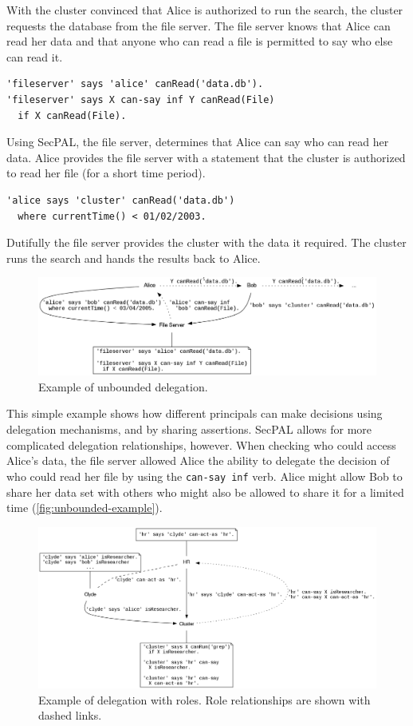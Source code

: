 \documentclass[thesis.tex]{subfiles}
\begin{document}
With the cluster convinced that Alice is authorized to run the search,
the cluster requests the database from the file server.  The file
server knows that Alice can read her data and that anyone who can read
a file is permitted to say who else can read it.
\begin{lstlisting}
'fileserver' says 'alice' canRead('data.db').
'fileserver' says X can-say inf Y canRead(File)
  if X canRead(File).
\end{lstlisting}
Using SecPAL, the file server, determines that Alice can say who can
read her data.  Alice provides the file server with a statement that
the cluster is authorized to read her file (for a short time
period).
\begin{lstlisting}
'alice says 'cluster' canRead('data.db')
  where currentTime() < 01/02/2003.
\end{lstlisting}
Dutifully the file server provides the cluster with the data
it required.  The cluster runs the search and hands the results back to Alice.

\begin{figure}
  \centering
  \includegraphics[width=\textwidth]{figures/secpal-example-delegation.png}
  \caption{Example of unbounded delegation.}
  \label{fig:unbounded-example}
\end{figure}

This simple example shows how different principals can make decisions using delegation mechanisms, and by sharing assertions.
SecPAL allows for more complicated delegation relationships, however. When checking who could access Alice's data, the file server allowed Alice the ability to delegate the decision of who could read her file by using the \texttt{can-say inf} verb.
Alice might allow Bob to share her data set with others who might also be allowed to share it for a limited time (\autoref{fig:unbounded-example}).

\begin{figure}
  \centering
  \includegraphics[width=\textwidth]{figures/secpal-example-roles.png}
  \caption[Example of delegation with roles.]{Example of delegation with roles.  Role relationships are shown with dashed links.}
  \label{fig:roles-example}
\end{figure}
\end{document}
